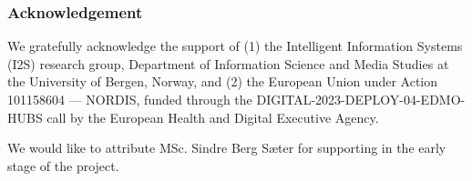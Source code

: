 \subsubsection*{Acknowledgement}
We gratefully acknowledge the support of (1) the Intelligent Information Systems (I2S) research group, Department of Information Science and Media Studies at the University of Bergen, Norway, and (2) the European Union under Action 101158604 — NORDIS, funded through the DIGITAL-2023-DEPLOY-04-EDMO-HUBS call by the European Health and Digital Executive Agency.

We would like to attribute MSc. Sindre Berg Sæter for supporting in the early stage of the project.